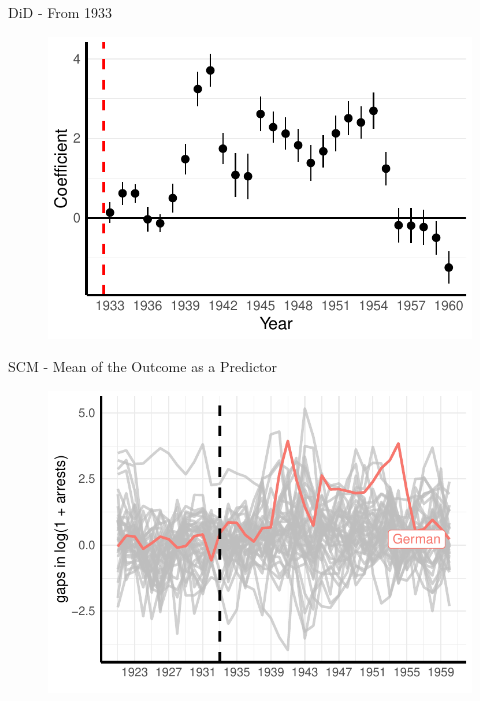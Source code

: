\documentclass[11pt]{beamer}
\begin{document}
\begin{frame}[label=did_from_1933]{DiD - From 1933}
 \begin{figure}[h]
\centering
\includegraphics[width=1\textwidth]{pred_full_imp_date_no_trends_geopol_cr2_base_1933.pdf}
\end{figure}
\hyperlink{robustness_checks}{}
\end{frame}



\begin{frame}[label=sc_mean]{SCM - Mean of the Outcome as a Predictor}
 \begin{figure}[h]
\centering
\includegraphics[width=1\textwidth]{placebo_highlight_all_imp_date_robustnes.pdf}
\end{figure}
\hyperlink{sc_robustness_checks}{}
\end{frame}
\end{document}
